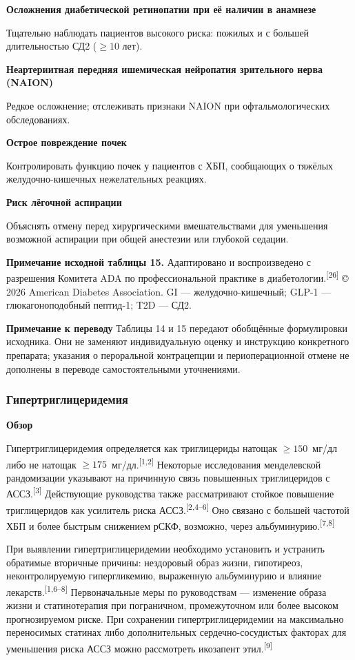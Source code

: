\documentclass[11pt,a4paper]{article}
\newcommand{\src}[1]{\textsuperscript{[#1]}}
\newcommand{\editorial}[1]{\par\begingroup\small\color{black!70}\textbf{Примечание к переводу} #1\par\endgroup}
\newcommand{\heading}[1]{\par\medskip\textbf{#1}\par}
\begin{document}
\heading{Осложнения диабетической ретинопатии при её наличии в анамнезе}
Тщательно наблюдать пациентов высокого риска: пожилых и с большей длительностью СД2 ($\geq10$ лет).

\heading{Неартериитная передняя ишемическая нейропатия зрительного нерва (NAION)}
Редкое осложнение; отслеживать признаки NAION при офтальмологических обследованиях.

\heading{Острое повреждение почек}
Контролировать функцию почек у пациентов с ХБП, сообщающих о тяжёлых желудочно-кишечных нежелательных реакциях.

\heading{Риск лёгочной аспирации}
Объяснять отмену перед хирургическими вмешательствами для уменьшения возможной аспирации при общей анестезии или глубокой седации.

\textbf{Примечание исходной таблицы 15.} Адаптировано и воспроизведено с разрешения Комитета ADA по профессиональной практике в диабетологии.\src{26} © 2026 American Diabetes Association. GI --- желудочно-кишечный; GLP-1 --- глюкагоноподобный пептид-1; T2D --- СД2.
\editorial{Таблицы 14 и 15 передают обобщённые формулировки исходника. Они не заменяют индивидуальную оценку и инструкцию конкретного препарата; указания о пероральной контрацепции и периоперационной отмене не дополнены в переводе самостоятельными уточнениями.}

\subsubsection{Гипертриглицеридемия}
\heading{Обзор}
Гипертриглицеридемия определяется как триглицериды натощак $\geq150$~мг/дл либо не натощак $\geq175$~мг/дл.\src{1,2} Некоторые исследования менделевской рандомизации указывают на причинную связь повышенных триглицеридов с АССЗ.\src{3} Действующие руководства также рассматривают стойкое повышение триглицеридов как усилитель риска АССЗ.\src{2,4--6} Оно связано с большей частотой ХБП и более быстрым снижением рСКФ, возможно, через альбуминурию.\src{7,8}

При выявлении гипертриглицеридемии необходимо установить и устранить обратимые вторичные причины: нездоровый образ жизни, гипотиреоз, неконтролируемую гипергликемию, выраженную альбуминурию и влияние лекарств.\src{1,6--8} Первоначальные меры по руководствам --- изменение образа жизни и статинотерапия при пограничном, промежуточном или более высоком прогнозируемом риске. При сохранении гипертриглицеридемии на максимально переносимых статинах либо дополнительных сердечно-сосудистых факторах для уменьшения риска АССЗ можно рассмотреть икозапент этил.\src{9}
\end{document}
